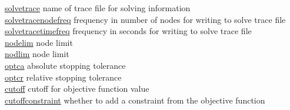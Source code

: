 \begin{tabbing}
\hyperlink{solvetrace}
{solvetrace} \> name of trace file for solving information \\
\hyperlink{solvetracenodefreq}
{solvetracenodefreq} \> frequency in number of nodes for writing to solve trace file \\
\hyperlink{solvetracetimefreq}
{solvetracetimefreq} \> frequency in seconds for writing to solve trace file \\
\hyperlink{nodelim}
{nodelim} \> node limit \\
\hyperlink{nodlim}
{nodlim} \> node limit \\
\hyperlink{optca}
{optca} \> absolute stopping tolerance \\
\hyperlink{optcr}
{optcr} \> relative stopping tolerance \\
\hyperlink{cutoff}
{cutoff} \> cutoff for objective function value \\
\hyperlink{cutoffconstraint}
{cutoffconstraint} \> whether to add a constraint from the objective function
\end{tabbing}


